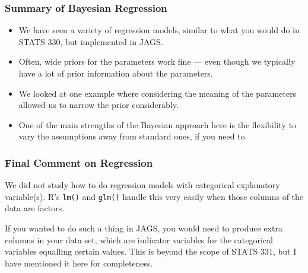 \documentclass{beamer}
\begin{document}
\begin{frame}[fragile]
\frametitle{Summary of Bayesian Regression}

\begin{itemize}
\item We have seen a variety of regression models, similar to what you would
do in STATS 330, but implemented in JAGS.\pause
\item Often, wide priors for the parameters work fine --- even though we typically
have a lot of prior information about the parameters.\pause
\item We looked at one example where considering the meaning of the parameters
allowed us to narrow the prior considerably.\pause
\item One of the main strengths of the Bayesian approach here is the flexibility
to vary the assumptions away from standard ones, if you need to.
\end{itemize}

\end{frame}


\begin{frame}[fragile]
\frametitle{Final Comment on Regression}
We did not study how to do regression models with categorical explanatory
variable(s). R's \texttt{lm()} and \texttt{glm()} handle this
very easily when those columns of the data are factors.\\[0.5em]\pause

If you wanted to do such a thing in JAGS, you would need to produce extra
columns in your data set, which are indicator variables for the categorical
variables equalling certain values. This is beyond the scope of STATS 331,
but I have mentioned it here for completeness.


\end{frame}
\end{document}
